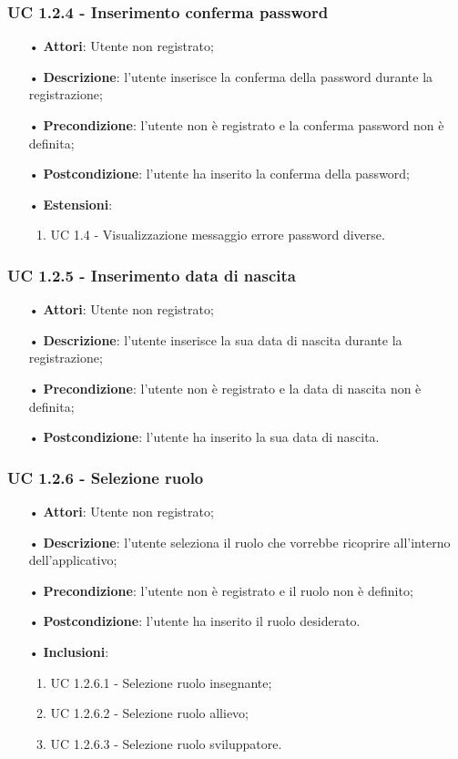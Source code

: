\subsubsection{UC 1.2.4 - Inserimento conferma password}
\begin{itemize}
	\item[•]\textbf{Attori}: Utente non registrato;
	\item[•]\textbf{Descrizione}: l'utente inserisce la conferma della password durante la registrazione;
	\item[•]\textbf{Precondizione}: l'utente non è registrato e la conferma password non è definita;
	\item[•]\textbf{Postcondizione}: l'utente ha inserito la conferma della password;
	\item[•] \textbf{Estensioni}:
		\begin{enumerate}
		\item UC 1.4 - Visualizzazione messaggio errore password diverse.
	\end{enumerate}
\end{itemize}

\subsubsection{UC 1.2.5 - Inserimento data di nascita}
\begin{itemize}
	\item[•]\textbf{Attori}: Utente non registrato;
	\item[•]\textbf{Descrizione}: l'utente inserisce la sua data di nascita durante la registrazione;
	\item[•]\textbf{Precondizione}: l'utente non è registrato e la data di nascita non è definita;
	\item[•]\textbf{Postcondizione}: l'utente ha inserito la sua data di nascita.
\end{itemize}

\subsubsection{UC 1.2.6 - Selezione ruolo}
\begin{itemize}
	\item[•]\textbf{Attori}: Utente non registrato;
	\item[•]\textbf{Descrizione}: l'utente seleziona il ruolo che vorrebbe ricoprire all'interno dell'applicativo;
	\item[•]\textbf{Precondizione}: l'utente non è registrato e il ruolo non è definito;
	\item[•]\textbf{Postcondizione}: l'utente ha inserito il ruolo desiderato.
	\item[•]\textbf{Inclusioni}:
	\begin{enumerate}
		\item UC 1.2.6.1 - Selezione ruolo insegnante;
		\item UC 1.2.6.2 - Selezione ruolo allievo;
		\item UC 1.2.6.3 - Selezione ruolo sviluppatore.
	\end{enumerate}
\end{itemize}


